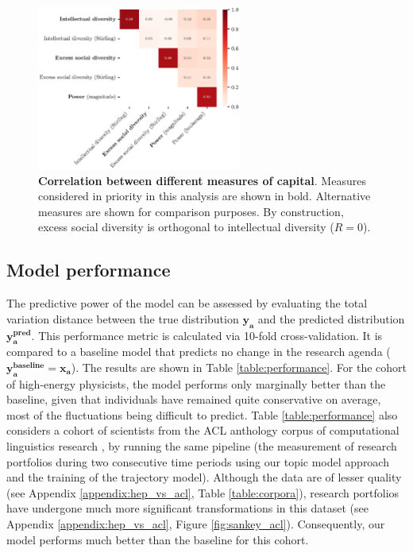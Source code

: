 \documentclass{article}
\begin{document}
\begin{figure}[h]
    \centering
    \includegraphics[width=0.6\textwidth]{plots/Fig12.eps}
    \caption{\textbf{Correlation between different measures of capital}. Measures considered in priority in this analysis are shown in bold. Alternative measures are shown for comparison purposes. By construction, excess social diversity is orthogonal to intellectual diversity ($R=0$). }
    \label{fig:capital_measures}
\end{figure}

\subsection{\label{appendix:model-performance}Model performance}

The predictive power of the model can be assessed by evaluating the total variation distance between the true distribution $\bm{y_a}$ and the predicted distribution $\bm{y_a^{\text{pred}}}$. This performance metric is calculated via 10-fold cross-validation. It is compared  to a baseline model that predicts no change in the research agenda ($\bm{y_a^{\text{baseline}}}=\bm{x_a}$). The results are shown in Table \ref{table:performance}. For the cohort of high-energy physicists, the model performs only marginally better than the baseline, given that individuals have remained quite conservative on average, most of the fluctuations being difficult to predict. Table \ref{table:performance} also considers a cohort of scientists from the ACL anthology corpus  of computational linguistics research \citep{acl_anthology_corpus}, by running the same pipeline (the measurement of research portfolios during two consecutive time periods using our topic model approach and the training of the trajectory model). Although the data are of lesser quality (see Appendix \ref{appendix:hep_vs_acl}, Table \ref{table:corpora}), research portfolios have undergone much more significant transformations in this dataset (see Appendix \ref{appendix:hep_vs_acl}, Figure \ref{fig:sankey_acl}). Consequently, our model performs much better than the baseline for this cohort.
\end{document}
